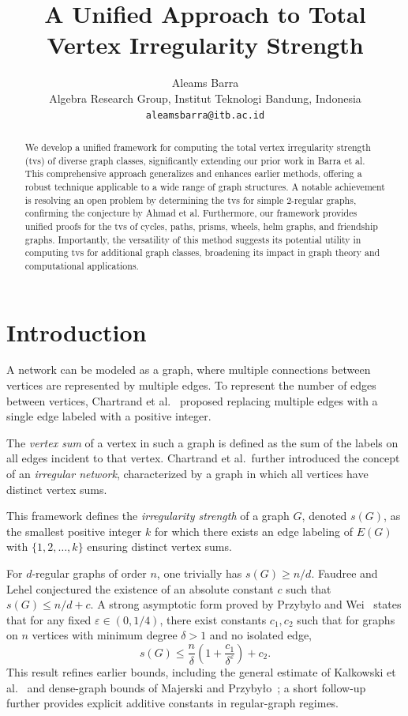 \documentclass[11pt]{article}
\title{A Unified Approach to Total Vertex Irregularity Strength}
\author{Aleams Barra\\
Algebra Research Group, Institut Teknologi Bandung, Indonesia\\
\texttt{aleamsbarra@itb.ac.id}}
\date{}
\numberwithin{equation}{section}
\begin{document}
\maketitle

\begin{abstract}
We develop a unified framework for computing the total vertex irregularity strength (tvs) of diverse graph classes, significantly extending our prior work in Barra et al. This comprehensive approach generalizes and enhances earlier methods, offering a robust technique applicable to a wide range of graph structures. A notable achievement is resolving an open problem by determining the tvs for simple 2-regular graphs, confirming the conjecture by Ahmad et al. Furthermore, our framework provides unified proofs for the tvs of cycles, paths, prisms, wheels, helm graphs, and friendship graphs. Importantly, the versatility of this method suggests its potential utility in computing tvs for additional graph classes, broadening its impact in graph theory and computational applications.
\end{abstract}

\section{Introduction}
A network can be modeled as a graph, where multiple connections between vertices are represented by multiple edges. To represent the number of edges between vertices, Chartrand et al.~\cite{chartrand1988irregular} proposed replacing multiple edges with a single edge labeled with a positive integer.

The \emph{vertex sum} of a vertex in such a graph is defined as the sum of the labels on all edges incident to that vertex. Chartrand et al.~further introduced the concept of an \emph{irregular network}, characterized by a graph in which all vertices have distinct vertex sums. 

This framework defines the \emph{irregularity strength} of a graph \(G\), denoted \(s(G)\), as the smallest positive integer \(k\) for which there exists an edge labeling of \(E(G)\) with \(\{1, 2, \ldots, k\}\) ensuring distinct vertex sums.

For \(d\)-regular graphs of order \(n\), one trivially has \(s(G)\ge n/d\). Faudree and Lehel conjectured the existence of an absolute constant \(c\) such that \(s(G)\le n/d + c\). A strong asymptotic form proved by Przyby{\l}o and Wei~\cite{przybylo2023asymptotic} states that for any fixed \(\varepsilon\in(0,1/4)\), there exist constants \(c_1,c_2\) such that for graphs on \(n\) vertices with minimum degree \(\delta>1\) and no isolated edge,
\[
s(G)\le \frac{n}{\delta}\left(1+\frac{c_1}{\delta^{\varepsilon}}\right)+c_2.
\]
This result refines earlier bounds, including the general estimate of Kalkowski et al.~\cite{kalkowski2011upper} and dense-graph bounds of Majerski and Przyby{\l}o~\cite{majerski2014dense}; a short follow-up~\cite{przybylo2023short} further provides explicit additive constants in regular-graph regimes.
\end{document}

